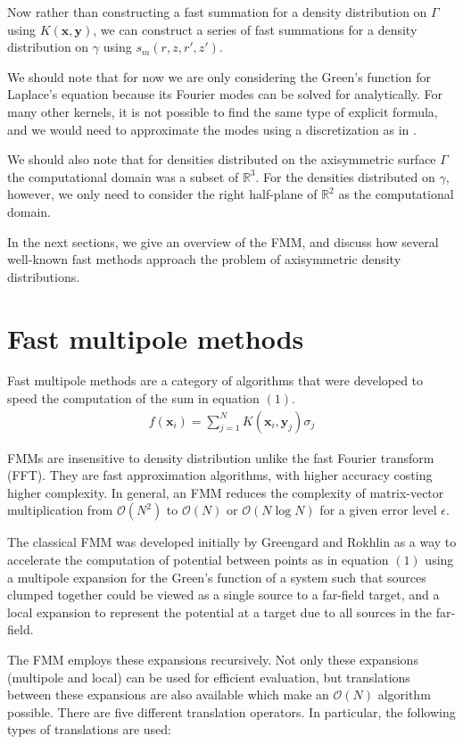 \documentclass[11pt, oneside]{article}   	%
\begin{document}
Now rather than constructing a fast summation for a density distribution on $\Gamma$ using $K(\mathbf{x},\mathbf{y})$, we can construct a series of fast summations for a density distribution on $\gamma$ using $s_m(r,z,r',z')$.

We should note that for now we are only considering the Green's function for Laplace's equation because its Fourier modes can be solved for analytically. For many other kernels, it is not possible to find the same type of explicit formula, and we would need to approximate the modes using a discretization as in \cite{YYM}.

We should also note that for densities distributed on the axisymmetric surface $\Gamma$ the computational domain was a subset of $\mathbb{R}^3$. For the densities distributed on $\gamma$, however, we only need to consider the right half-plane of $\mathbb{R}^2$ as the computational domain.

In the next sections, we give an overview of the FMM, and discuss how several well-known fast methods approach the problem of axisymmetric density distributions.

\section{Fast multipole methods}
Fast multipole methods are a category of algorithms that were developed to speed the computation of the sum in equation $(1)$.
\begin{align}
f(\mathbf{x}_i) = \sum_{j=1}^N K(\mathbf{x}_i,\mathbf{y}_j)\sigma_j
\end{align}

FMMs are insensitive to density distribution unlike the fast Fourier transform (FFT). They are fast approximation algorithms, with higher accuracy costing higher complexity. In general, an FMM reduces the complexity of matrix-vector multiplication from $\mathcal{O}(N^2)$ to $\mathcal{O}(N)$ or $\mathcal{O}(N\log N)$ for a given error level $\epsilon$.

The classical FMM was developed initially by Greengard and Rokhlin as a way to accelerate the computation of potential between points as in equation $(1)$ using a multipole expansion for the Green's function of a system such that sources clumped together could be viewed as a single source to a far-field target, and a local expansion to represent the potential at a target due to all sources in the far-field.

The FMM employs these expansions recursively. Not only these expansions (multipole and local) can be used for efficient evaluation, but translations between these expansions are also available which make an $\mathcal{O}(N)$ algorithm possible. There are five different translation operators. In particular, the following types of translations are used:
\end{document}
